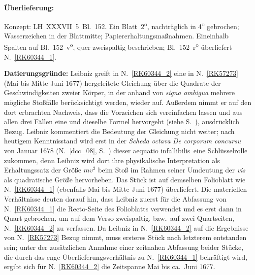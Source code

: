 %  
%
%
%
%
%
\frenchspacing
%
\begin{ledgroupsized}[r]{120mm}
\footnotesize
\pstart
\noindent\textbf{Überlieferung:}
\pend
\end{ledgroupsized}
%
\begin{ledgroupsized}[r]{114mm}
\footnotesize
\pstart \parindent -6mm
%
Konzept:
LH~XXXVII~5~Bl.~152. 
Ein Blatt~2\textsuperscript{o},
nachträglich in 4\textsuperscript{o} gebrochen;
Wasserzeichen in der Blattmitte;
Papiererhaltungsmaßnahmen.
Eineinhalb Spalten auf Bl.~152~v\textsuperscript{o}, quer zweispaltig beschrieben;
Bl.~152~r\textsuperscript{o} überliefert N.~\ref{RK60344_1}.
\pend
\end{ledgroupsized}
%
\vspace{5mm}
\begin{ledgroup}
\footnotesize
\pstart
\noindent%
\textbf{Datierungsgründe:} %
Leibniz greift in N.~\ref{RK60344_2} eine in N.~\ref{RK57273} (Mai bis Mitte Juni 1677) hergeleitete Gleichung 
%
über die Quadrate der Geschwindigkeiten zweier Körper, in der anhand von \textit{signa ambigua} 
%
mehrere mögliche Stoßfälle berücksichtigt werden, wieder auf.
%
Außerdem nimmt er auf den dort erbrachten Nachweis, dass die Vorzeichen sich vereinfachen lassen
%
und aus allen drei Fällen eine und dieselbe Formel hervorgeht (siehe S.~), ausdrücklich Bezug.
%
Leibniz kommentiert die Bedeutung der Gleichung nicht weiter;
%
nach heutigem Kenntnisstand wird erst in der
%
\textit{Scheda octava} \textit{De corporum concursu} von Januar 1678 (N.~\ref{dcc_08}, S.~)
%
dieser \glqq aequatio infallibilis\grqq\ eine Schlüsselrolle zukommen, denn Leibniz wird dort
%
ihre physikalische Interpretation als Erhaltungssatz der Größe $mv^2$ beim Stoß
%
im Rahmen seiner Umdeutung der \textit{vis} als quadratische Größe hervorheben.
%
\pend
%
\pstart
%
Das Stück ist auf demselben Folioblatt wie N.~\ref{RK60344_1} (ebenfalls Mai bis Mitte Juni 1677) überliefert.
%
Die materiellen Verhältnisse deuten darauf hin, dass Leibniz zuerst für die Abfassung von N.~\ref{RK60344_1} 
%
die Recto-Seite des Folioblatts verwendet und es erst dann in Quart gebrochen, um auf dem Verso
%
zweispaltig, bzw.\ auf zwei Quartseiten, N.~\ref{RK60344_2} zu verfassen.
\pend
%
\pstart
Da Leibniz in N.~\ref{RK60344_2} auf die Ergebnisse von N.~\ref{RK57273} Bezug nimmt,
%
muss ersteres Stück nach letzterem entstanden sein;
%
unter der zusätzlichen Annahme einer zeitnahen Abfassung beider Stücke, die durch 
%
das enge Überlieferungsverhältnis zu N.~\ref{RK60344_1} bekräftigt wird, 
%
ergibt sich für N.~\ref{RK60344_2} die Zeitspanne Mai bis ca.\ Juni 1677.
%
\pend
%
\end{ledgroup}
